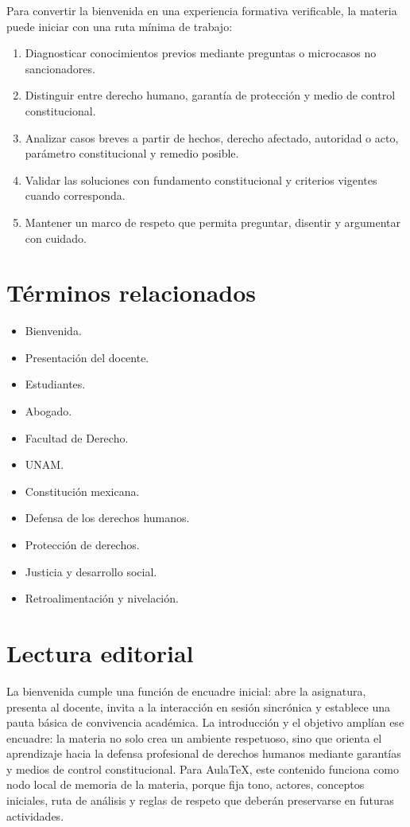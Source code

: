 \documentclass[
  spanish,
  letterpaper, oneside
]{article}
\begin{document}
Para convertir la bienvenida en una experiencia formativa verificable, la materia puede iniciar con una ruta mínima de trabajo:

\begin{enumerate}
  \item Diagnosticar conocimientos previos mediante preguntas o microcasos no sancionadores.
  \item Distinguir entre derecho humano, garantía de protección y medio de control constitucional.
  \item Analizar casos breves a partir de hechos, derecho afectado, autoridad o acto, parámetro constitucional y remedio posible.
  \item Validar las soluciones con fundamento constitucional y criterios vigentes cuando corresponda.
  \item Mantener un marco de respeto que permita preguntar, disentir y argumentar con cuidado.
\end{enumerate}

\section{Términos relacionados}

\begin{itemize}
  \item Bienvenida.
  \item Presentación del docente.
  \item Estudiantes.
  \item Abogado.
  \item Facultad de Derecho.
  \item UNAM.
  \item Constitución mexicana.
  \item Defensa de los derechos humanos.
  \item Protección de derechos.
  \item Justicia y desarrollo social.
  \item Retroalimentación y nivelación.
\end{itemize}

\section{Lectura editorial}

La bienvenida cumple una función de encuadre inicial: abre la asignatura, presenta al docente, invita a la interacción en sesión sincrónica y establece una pauta básica de convivencia académica. La introducción y el objetivo amplían ese encuadre: la materia no solo crea un ambiente respetuoso, sino que orienta el aprendizaje hacia la defensa profesional de derechos humanos mediante garantías y medios de control constitucional. Para AulaTeX, este contenido funciona como nodo local de memoria de la materia, porque fija tono, actores, conceptos iniciales, ruta de análisis y reglas de respeto que deberán preservarse en futuras actividades.
\end{document}
